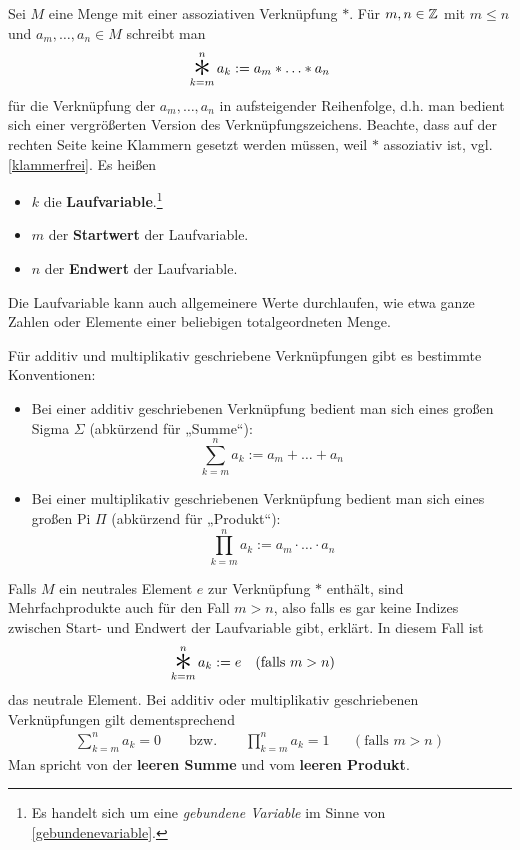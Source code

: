 \begin{nota}[Mehrfachprodukte] \label{mehrfachprodukt}
    Sei $M$ eine Menge mit einer assoziativen Verknüpfung $*$. Für $m,n\in \mathbb Z$ mit $m\le n$ und $a_m,\dots , a_n\in M$ schreibt man
        \[ \mathop{\raisebox{-0.6ex}{\scalebox{2.5}{$*$}}}_{k=m}^n a_k := a_m * \ldots * a_n \]
    für die Verknüpfung der $a_m,\dots , a_n$ in aufsteigender Reihenfolge, d.h. man bedient sich einer vergrößerten Version des Verknüpfungszeichens. Beachte, dass auf der rechten Seite keine Klammern gesetzt werden müssen, weil $*$ assoziativ ist, vgl. \cref{klammerfrei}. Es heißen
    \begin{itemize}
        \item $k$ die \textbf{Laufvariable}.\footnote{Es handelt sich um eine \emph{gebundene Variable} im Sinne von \cref{gebundenevariable}.}
        \item $m$ der \textbf{Startwert} der Laufvariable.
        \item $n$ der \textbf{Endwert} der Laufvariable.
    \end{itemize}
    Die Laufvariable kann auch allgemeinere Werte durchlaufen, wie etwa ganze Zahlen oder Elemente einer beliebigen totalgeordneten Menge.
    
    Für additiv und multiplikativ geschriebene Verknüpfungen gibt es bestimmte Konventionen:
    \begin{itemize}
        \item Bei einer additiv geschriebenen Verknüpfung bedient man sich eines großen Sigma $\Sigma$ (abkürzend für „Summe“):
            \[ \sum_{k=m}^n a_k := a_m + \ldots + a_n \]
        \item Bei einer multiplikativ geschriebenen Verknüpfung bedient man sich eines großen Pi $\Pi$ (abkürzend für „Produkt“):
            \[ \prod_{k=m}^n a_k := a_m \cdot \ldots \cdot a_n \]
    \end{itemize}
    Falls $M$ ein neutrales Element $e$ zur Verknüpfung $*$ enthält, sind Mehrfachprodukte auch für den Fall $m>n$, also falls es gar keine Indizes zwischen Start- und Endwert der Laufvariable gibt, erklärt. In diesem Fall ist
    \begin{align*}
        \mathop{\raisebox{-0.6ex}{\scalebox{2.5}{$*$}}}_{k=m}^n a_k & := e && (\text{falls $m>n$})
    \end{align*}
    das neutrale Element. Bei additiv oder multiplikativ geschriebenen Verknüpfungen gilt dementsprechend
    \begin{align*}
        \sum_{k=m}^n a_k = 0 \qquad\text{bzw.}\qquad \prod_{k=m}^n a_k = 1 && (\text{falls $m>n$})
    \end{align*}
    Man spricht von der \textbf{leeren Summe} und vom \textbf{leeren Produkt}.%
    

\end{nota}
